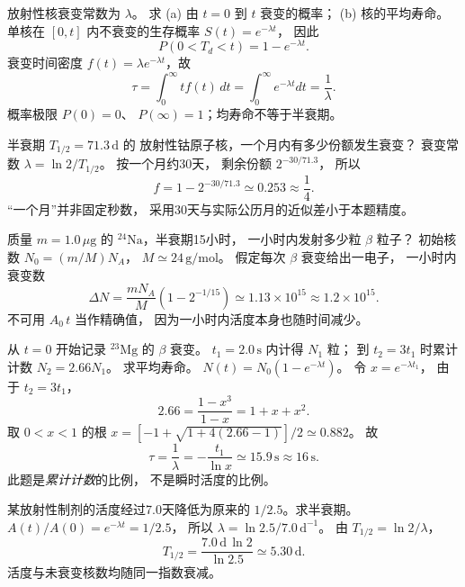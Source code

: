 
放射性核衰变常数为 $\lambda$。
求 (a) 由 $t=0$ 到 $t$ 衰变的概率；
(b) 核的平均寿命。
\exsolution
单核在 $[0,t]$ 内不衰变的生存概率
$S(t)=e^{-\lambda t}$，
因此
\[
 \boxed{P(0<T_d<t)=1-e^{-\lambda t}}.
\]
衰变时间密度
$f(t)=\lambda e^{-\lambda t}$，故
\[
 \boxed{\tau=\int_0^\infty t f(t)\,dt
 =\int_0^\infty e^{-\lambda t}dt
 =\frac1{\lambda}}.
\]
\excheck 概率极限 $P(0)=0$、
$P(\infty)=1$；均寿命不等于半衰期。

半衰期 $T_{1/2}=71.3\,\mathrm d$ 的
放射性钴原子核，一个月内有多少份额发生衰变？
\exsolution
衰变常数
$\lambda=\ln2/T_{1/2}$。
按一个月约30天，
剩余份额 $2^{-30/71.3}$，
所以
\[
 \boxed{f=1-2^{-30/71.3}\simeq0.253
 \approx\frac14}.
\]
\excheck “一个月”并非固定秒数，
采用30天与实际公历月的近似差小于本题精度。

质量 $m=1.0\,\mu\mathrm g$ 的
$\mathrm{^{24}Na}$，半衰期15小时，
一小时内发射多少粒 $\beta$ 粒子？
\exsolution
初始核数
$N_0=(m/M)N_A$，
$M\simeq24\,\mathrm{g/mol}$。
假定每次 $\beta$ 衰变给出一电子，
一小时内衰变数
\[
 \boxed{\Delta N=
 \frac{mN_A}{M}
 \left(1-2^{-1/15}\right)
 \simeq1.13\times10^{15}\approx1.2\times10^{15}}.
\]
\excheck 不可用 $A_0\,t$ 当作精确值，
因为一小时内活度本身也随时间减少。

从 $t=0$ 开始记录
$\mathrm{^{23}Mg}$ 的 $\beta$ 衰变。
$t_1=2.0\,\mathrm s$ 内计得 $N_1$ 粒；
到 $t_2=3t_1$ 时累计计数
$N_2=2.66N_1$。
求平均寿命。
\exsolution
$N(t)=N_0(1-e^{-\lambda t})$。
令 $x=e^{-\lambda t_1}$，
由于 $t_2=3t_1$，
\[
 2.66=\frac{1-x^3}{1-x}=1+x+x^2.
\]
取 $0<x<1$ 的根
$x=[-1+\sqrt{1+4(2.66-1)}]/2\simeq0.882$。
故
\[
 \boxed{\tau=\frac1\lambda=
 -\frac{t_1}{\ln x}\simeq15.9\,\mathrm s
 \approx16\,\mathrm s}.
\]
\excheck 此题是\emph{累计计数}的比例，
不是瞬时活度的比例。

某放射性制剂的活度经过7.0天降低为原来的
$1/2.5$。求半衰期。
\exsolution
$A(t)/A(0)=e^{-\lambda t}=1/2.5$，
所以 $\lambda=\ln2.5/7.0\,\mathrm{d^{-1}}$。
由 $T_{1/2}=\ln2/\lambda$，
\[
 \boxed{T_{1/2}=
 \frac{7.0\,\mathrm d\,\ln2}{\ln2.5}
 \simeq5.30\,\mathrm d}.
\]
\excheck 活度与未衰变核数均随同一指数衰减。

